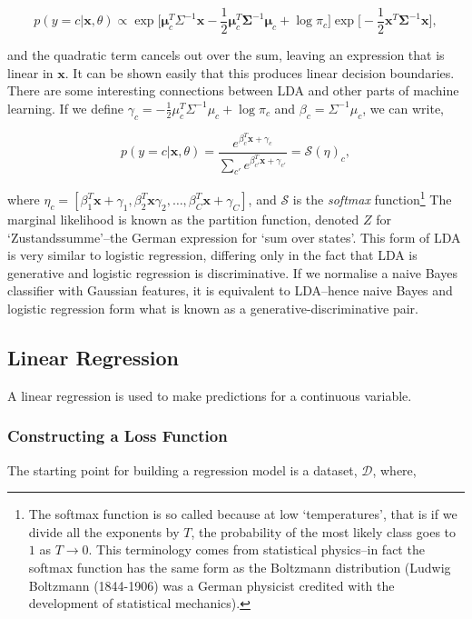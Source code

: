 \documentclass[11pt]{amsart}
\begin{document}
$$p(y = c|\mathbf{x}, \theta) \propto \exp\Big[\boldsymbol\mu_c^T\Sigma^{-1}\mathbf{x} - \frac{1}{2}\boldsymbol\mu_c^T\boldsymbol\Sigma^{-1}\boldsymbol\mu_c + \log\pi_c\Big]\exp\Big[-\frac{1}{2}\mathbf{x}^T\boldsymbol\Sigma^{-1}\mathbf{x}\Big],$$

and the quadratic term cancels out over the sum, leaving an expression that is linear in $\mathbf{x}$. It can be shown easily that this produces linear decision boundaries. There are some interesting connections between LDA and other parts of machine learning. If we define $\gamma_c = - \frac{1}{2}\mu_c^T\Sigma^{-1}\mu_c + \log\pi_c$ and $\beta_c = \Sigma^{-1}\mu_c$, we can write,

$$p(y = c|\mathbf{x}, \theta) = \frac{e^{\beta_c^T\mathbf{x} + \gamma_c}}{\sum_{c'}e^{\beta_{c'}^T\mathbf{x} + \gamma_{c'}}} = \mathcal{S}({\eta})_c,$$

where $\eta_c = [\beta_1^T\mathbf{x} + \gamma_1, \beta_2^T\mathbf{x} \gamma_2 , \dots, \beta_C^T\mathbf{x} + \gamma_C]$, and $\mathcal{S}$ is the \emph{softmax} function\footnote{The softmax function is so called because at low `temperatures', that is if we divide all the exponents by $T$, the probability of the most likely class goes to $1$ as $T \to 0$. This terminology comes from statistical physics--in fact the softmax function has the same form as the Boltzmann distribution (Ludwig Boltzmann (1844-1906) was a German physicist credited with the development of statistical mechanics).} The marginal likelihood is known as the partition function, denoted $Z$ for `Zustandssumme'--the German expression for `sum over states'. This form of LDA is very similar to logistic regression, differing only in the fact that LDA is generative and logistic regression is discriminative. If we normalise a naive Bayes classifier with Gaussian features, it is equivalent to LDA--hence naive Bayes and logistic regression form what is known as a generative-discriminative pair.

\subsection{Linear Regression}

A linear regression is used to make predictions for a continuous variable.

\subsubsection{Constructing a Loss Function}
The starting point for building a regression model is a dataset, $\mathcal{D}$, where,
\end{document}
